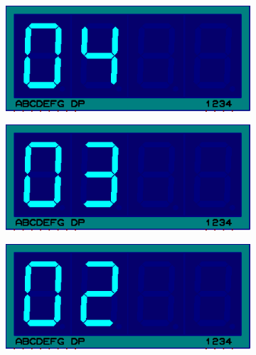 \documentclass{lab_sheet}
\begin{document}
\begin{figure}[H]
          \begin{subfigure}{.33\textwidth}
            \centering
            \includegraphics[frame,width=.9\linewidth]{../Figures/d4}   
            \caption{}
            \label{fig:prob2-a11}
          \end{subfigure}
          \begin{subfigure}{.33\textwidth}
            \centering
            \includegraphics[frame,width=.9\linewidth]{../Figures/d3}   
            \caption{}
            \label{fig:prob2-a12}
          \end{subfigure}
          \begin{subfigure}{.33\textwidth}
            \centering
            \includegraphics[frame,width=.9\linewidth]{../Figures/d2}   
            \caption{}
            \label{fig:prob2-a13}
          \end{subfigure}
          \newline
          \hspace*{\fill}

\end{figure}
\end{document}
